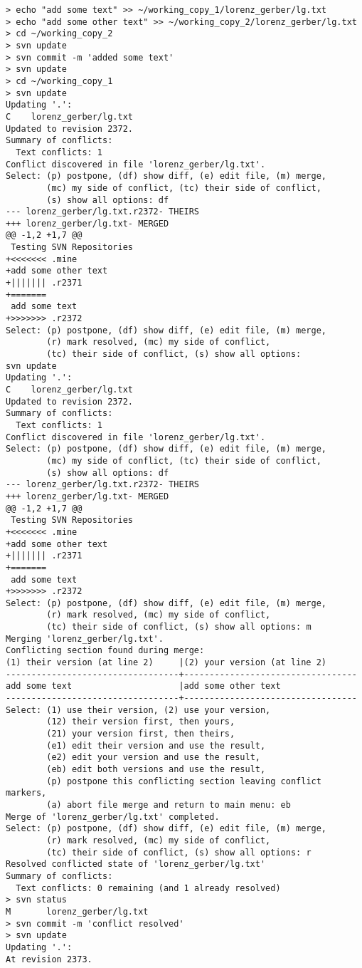 \documentclass[a4paper,11pt,twoside]{article}
\begin{document}
\begin{enumerate}
\begin{verbatim}
> echo "add some text" >> ~/working_copy_1/lorenz_gerber/lg.txt
> echo "add some other text" >> ~/working_copy_2/lorenz_gerber/lg.txt
> cd ~/working_copy_2
> svn update
> svn commit -m 'added some text'
> svn update
> cd ~/working_copy_1
> svn update
Updating '.':
C    lorenz_gerber/lg.txt
Updated to revision 2372.
Summary of conflicts:
  Text conflicts: 1
Conflict discovered in file 'lorenz_gerber/lg.txt'.
Select: (p) postpone, (df) show diff, (e) edit file, (m) merge,
        (mc) my side of conflict, (tc) their side of conflict,
        (s) show all options: df
--- lorenz_gerber/lg.txt.r2372- THEIRS
+++ lorenz_gerber/lg.txt- MERGED
@@ -1,2 +1,7 @@
 Testing SVN Repositories
+<<<<<<< .mine
+add some other text
+||||||| .r2371
+=======
 add some text
+>>>>>>> .r2372
Select: (p) postpone, (df) show diff, (e) edit file, (m) merge,
        (r) mark resolved, (mc) my side of conflict,
        (tc) their side of conflict, (s) show all options: 
svn update
Updating '.':
C    lorenz_gerber/lg.txt
Updated to revision 2372.
Summary of conflicts:
  Text conflicts: 1
Conflict discovered in file 'lorenz_gerber/lg.txt'.
Select: (p) postpone, (df) show diff, (e) edit file, (m) merge,
        (mc) my side of conflict, (tc) their side of conflict,
        (s) show all options: df
--- lorenz_gerber/lg.txt.r2372- THEIRS
+++ lorenz_gerber/lg.txt- MERGED
@@ -1,2 +1,7 @@
 Testing SVN Repositories
+<<<<<<< .mine
+add some other text
+||||||| .r2371
+=======
 add some text
+>>>>>>> .r2372
Select: (p) postpone, (df) show diff, (e) edit file, (m) merge,
        (r) mark resolved, (mc) my side of conflict,
        (tc) their side of conflict, (s) show all options: m
Merging 'lorenz_gerber/lg.txt'.
Conflicting section found during merge:
(1) their version (at line 2)     |(2) your version (at line 2)           
----------------------------------+----------------------------------
add some text                     |add some other text               
----------------------------------+----------------------------------
Select: (1) use their version, (2) use your version,
        (12) their version first, then yours,
        (21) your version first, then theirs,
        (e1) edit their version and use the result,
        (e2) edit your version and use the result,
        (eb) edit both versions and use the result,
        (p) postpone this conflicting section leaving conflict markers,
        (a) abort file merge and return to main menu: eb
Merge of 'lorenz_gerber/lg.txt' completed.
Select: (p) postpone, (df) show diff, (e) edit file, (m) merge,
        (r) mark resolved, (mc) my side of conflict,
        (tc) their side of conflict, (s) show all options: r
Resolved conflicted state of 'lorenz_gerber/lg.txt'
Summary of conflicts:
  Text conflicts: 0 remaining (and 1 already resolved)
> svn status
M       lorenz_gerber/lg.txt
> svn commit -m 'conflict resolved'
> svn update
Updating '.':
At revision 2373.

\end{verbatim}
\end{enumerate}
\end{document}

